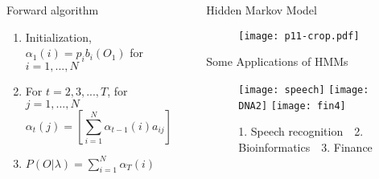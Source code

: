 \documentclass[final]{beamer}
\newlength{\sepwid}
\newlength{\onecolwid}
\begin{document}
\begin{frame}[t]
\begin{columns}[t]
\begin{column}{\onecolwid}
\begin{block}{Forward algorithm}
\begin{enumerate}
\item Initialization, $\alpha_1(i) = p_i b_i(O_1)$  for $i=1,..., N$
\vspace{.5cm}
\item For $t = 2, 3, . . . , T$, for $j=1,...,N$
 $$\alpha_t(j) = \displaystyle{\left[\sum_{i=1}^N \alpha_{t-1} (i) a_{ij}\right]} b_j (O_t), $$
\item
$P (O|\lambda) =
\sum_{i=1}^N\alpha_T(i)$
\end{enumerate}
\end{block}





    \end{column}
    \begin{column}{\sepwid}\end{column}			%
    \begin{column}{\onecolwid}
    \begin{block}{Hidden Markov Model}
    \begin{figure}[ht]
\begin{center}
\texttt{[image: p11-crop.pdf]}
\end{center}
\end{figure}
 \end{block}

\begin{block}{Some Applications of HMMs}
 \begin{figure}[ht]
\begin{center}
    \texttt{[image: speech]}
    \texttt{[image: DNA2]}
    \texttt{[image: fin4]}
\end{center}
\caption{1. Speech recognition~~2. Bioinformatics~~3. Finance}
\end{figure}

 \end{block}



\end{column}
\end{columns}
\end{frame}
\end{document}
